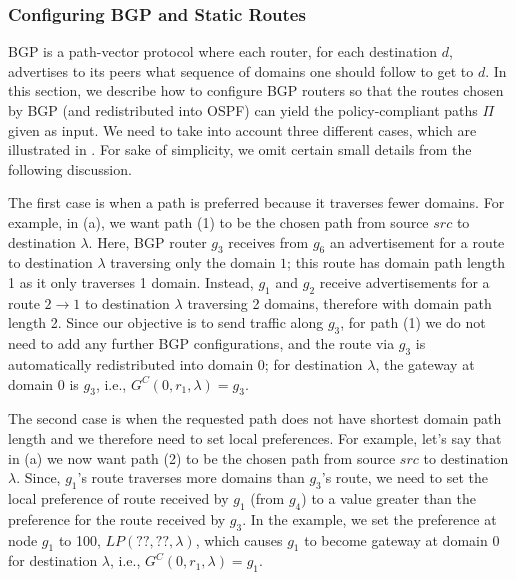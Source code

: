 \subsubsection{Configuring BGP and Static Routes}
BGP is a path-vector protocol where each router,
for each destination $d$,
advertises to its peers
what sequence of domains one should follow to get to  $d$.  
In this section, we describe how to configure
BGP routers so that the routes chosen by BGP (and redistributed into OSPF) 
can yield the policy-compliant
paths $\Pi$ given as input. 
We need to take into account three different
cases, which are illustrated in .  
For sake of simplicity, we omit certain small details from the following discussion.

The first case is when a path is preferred because it traverses fewer domains.
For example, in (a), we want
path (1) to be the chosen path from source $src$ to destination $\lambda$.
Here, BGP router $g_3$ receives from $g_6$ an advertisement for a route to destination $\lambda$
traversing only the domain $1$; this route has domain path length 1 as it only traverses 1 domain. 
Instead, $g_1$ and $g_2$ receive advertisements for a route $2 \rightarrow 1$
to destination $\lambda$ traversing 2 domains, therefore with 
domain path length 2. Since our objective is to send traffic along
$g_3$, for path (1) we do not need to add any further BGP configurations,
and the route via $g_3$ is automatically redistributed into domain 0;
for destination $\lambda$, the gateway at domain 0 is $g_3$, i.e.,
$G^C(0, r_1, \lambda) = g_3$.

The second case is when the requested path does not have shortest domain path length
and we therefore need to set local preferences.
For example, let's say that in (a) we now want
path (2) to be the chosen path from source $src$
to destination $\lambda$. 
Since, $g_1$'s route traverses more domains than
 $g_3$'s route,
we need to set the local preference of route received by $g_1$ 
(from $g_4$) to a value greater than the preference for the route received by $g_3$. 
In the example, we set the preference at node $g_1$ to 
100, $LP(??, ??, \lambda)$,
which causes $g_1$ to become gateway at domain 0 for destination $\lambda$, i.e., 
$G^C(0, r_1, \lambda) = g_1$.

